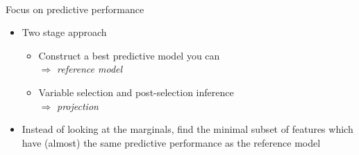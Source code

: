 \documentclass[english,t]{beamer}
\begin{document}
\begin{frame}{}
{\begin{minipage}[b][8.1cm][t]{12.1cm}
      \\
\end{minipage}
}
\end{frame}

\begin{frame}{}

  {\Large\color{navyblue} Focus on predictive performance}

  \begin{itemize}
  \item Two stage approach
    \begin{itemize}
    \item Construct a best predictive model you can\\ $\Rightarrow$ {\it reference model}
    \item Variable selection and post-selection inference\\ $\Rightarrow$ {\it projection}
    \end{itemize}
  \item<2-> Instead of looking at the marginals, find the minimal
    subset of features which have (almost) the same predictive
    performance as the reference model
  \end{itemize}
  
\end{frame}
\end{document}

